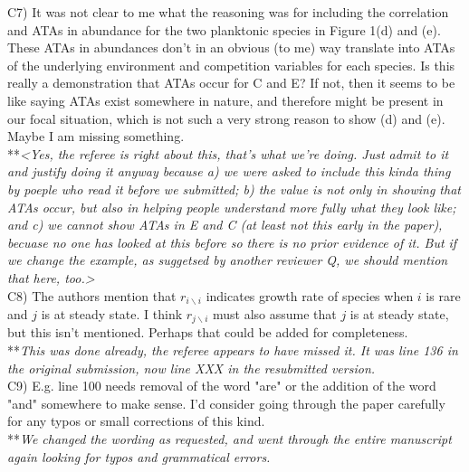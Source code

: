\documentclass[letterpaper,11pt]{article}
\newcommand{\bs}{\backslash}
\begin{document}
\noindent C7) It was not clear to me what the reasoning was for including the correlation and ATAs in abundance for the two planktonic species in Figure 1(d) and (e).  These ATAs in abundances don't in an obvious (to me) way translate into ATAs of the underlying environment and competition variables for each species. Is this really a demonstration that ATAs occur for C and E?  If not, then it seems to be like saying ATAs exist somewhere in nature, and therefore might be present in our focal situation, which is not such a very strong reason to show (d) and (e).  Maybe I am missing something. \\

\noindent ***\emph{<Yes, the referee is right about this, that's what we're doing. Just admit to it and justify doing it anyway because a) we were asked to include this kinda thing by poeple who read it before we submitted; b) the value is not only in showing that ATAs occur, but also in helping people understand more fully what they look like; and c) we cannot show ATAs in E and C (at least not this early in the paper), becuase no one has looked at this before so there is no prior evidence of it. But if we change the example, as suggetsed by another reviewer Q, we should mention that here, too.>} \\

\noindent C8) The authors mention that $r_{i \bs i}$ indicates growth rate of species when $i$ is rare and $j$ is at steady state.  I think $r_{j \bs i}$ must also assume that $j$ is at steady state, but this isn't mentioned. Perhaps that could be added for completeness. \\

\noindent ***\emph{This was done already, the referee appears to have missed it. It was line 136 in the original submission,
now line XXX in the resubmitted version.} \\

\noindent C9) E.g. line 100 needs removal of the word "are" or the addition of the word "and" somewhere to make sense. I'd consider going through the paper carefully for any typos or small corrections of this kind. \\

\noindent ***\emph{We changed the wording as requested, and went through the entire manuscript again looking for typos
and grammatical errors.} \\
\end{document}
